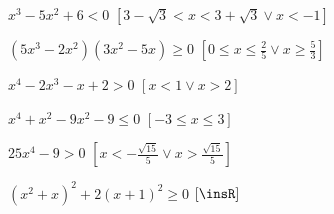 \begin{esercizio}[\Ast]
\begin{enumeratea}
\item \(x^3-5x^2+6<0\) \hfill \(\left[3-\sqrt 3<x<3+\sqrt 3\vee x<-1\right]\)
\item \(\left(5x^3-2x^2\right)\left(3x^2-5x\right)\ge 0\) 
 \hfill \(\left[0\le x\le \frac 2 5\vee x\ge \frac 5 3\right]\)
\item \(x^4-2x^3-x+2>0\) \hfill \(\left[x<1\vee x>2\right]\)
\item \(x^4+x^2-9x^2-9\le 0\) \hfill \(\left[-3\le x\le 3\right]\)
\item \(25x^4-9>0\) 
 \hfill \(\left[x<-\frac{\sqrt{15}} 5\vee x>\frac{\sqrt{15}} 5\right]\)
\item \(\left(x^2+x\right)^2+2\left(x+1\right)^2\ge 0\) 
 \hfill \(\left[\insR\right]\)
\end{enumeratea}
\end{esercizio}
% 
% 
